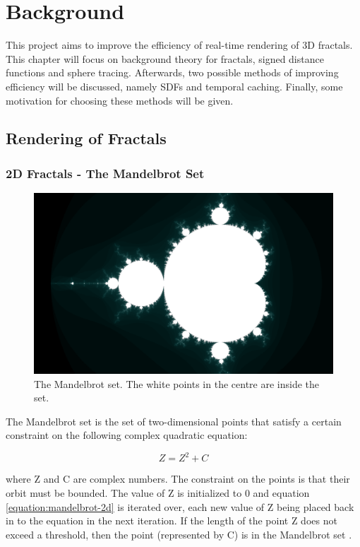 \chapter{Background}
\label{chapter:background}

This project aims to improve the efficiency of real-time rendering of 3D fractals. This chapter will focus on background theory for fractals, signed distance functions and sphere tracing. Afterwards, two possible methods of improving efficiency will be discussed, namely SDFs and temporal caching. Finally, some motivation for choosing these methods will be given.

\section{Rendering of Fractals}

\subsection{2D Fractals - The Mandelbrot Set}

\begin{figure}[ht]
	\centering
	\includegraphics[width=0.65\linewidth, frame]{Images/Mandelbrot-2D-Full.png}
	\caption{The Mandelbrot set. The white points in the centre are inside the set.}
	\label{figure:mandelbrot-2d-full}
\end{figure}

The Mandelbrot set is the set of two-dimensional points that satisfy a certain constraint on the following complex quadratic equation:

\begin{equation} \label{equation:mandelbrot-2d}
	Z = {Z^2} + C
\end{equation}

where Z and C are complex numbers. The constraint on the points is that their orbit must be bounded. The value of Z is initialized to 0 and equation \ref{equation:mandelbrot-2d} is iterated over, each new value of Z being placed back in to the equation in the next iteration. If the length of the point Z does not exceed a threshold, then the point (represented by C) is in the Mandelbrot set \cite{devaney1999mandelbrot}.\newline

